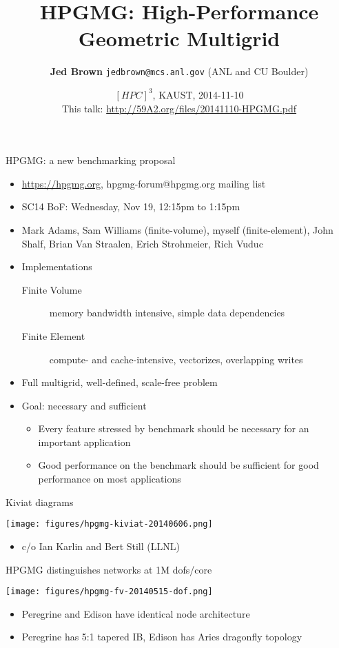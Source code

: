 \documentclass{beamer}
\title{HPGMG: High-Performance Geometric Multigrid}
\author{{\bf Jed Brown} \texttt{jedbrown@mcs.anl.gov} (ANL and CU Boulder)
}
\date{$[HPC]^3$, KAUST, 2014-11-10 \\[1em]
{\small This talk: \url{http://59A2.org/files/20141110-HPGMG.pdf}}}
\begin{document}
\lstset{language=C}
\normalem

\begin{frame}{HPGMG: a new benchmarking proposal}
  \begin{itemize}
  \item \url{https://hpgmg.org}, hpgmg-forum@hpgmg.org mailing list
  \item SC14 BoF: Wednesday, Nov 19, 12:15pm to 1:15pm
  \item Mark Adams, Sam Williams (finite-volume), myself (finite-element), John Shalf, Brian Van Straalen, Erich Strohmeier, Rich Vuduc
  \item Implementations
    \begin{description}
    \item[Finite Volume] memory bandwidth intensive, simple data dependencies
    \item[Finite Element] compute- and cache-intensive, vectorizes, overlapping writes
    \end{description}
  \item Full multigrid, well-defined, scale-free problem
  \item Goal: necessary and sufficient
    \begin{itemize}
    \item Every feature stressed by benchmark should be necessary for an important application
    \item Good performance on the benchmark should be sufficient for good performance on most applications
    \end{itemize}
  \end{itemize}
\end{frame}

\begin{frame}{Kiviat diagrams}
  \begin{center}
    \texttt{[image: figures/hpgmg-kiviat-20140606.png]}
  \end{center}
  \begin{itemize}
  \item c/o Ian Karlin and Bert Still (LLNL)
  \end{itemize}
\end{frame}

\begin{frame}{HPGMG distinguishes networks at 1M dofs/core}
  \begin{center}
    \texttt{[image: figures/hpgmg-fv-20140515-dof.png]}
  \end{center}
  \begin{itemize}
  \item Peregrine and Edison have identical node architecture
  \item Peregrine has 5:1 tapered IB, Edison has Aries dragonfly topology
  \end{itemize}
\end{frame}
\end{document}
